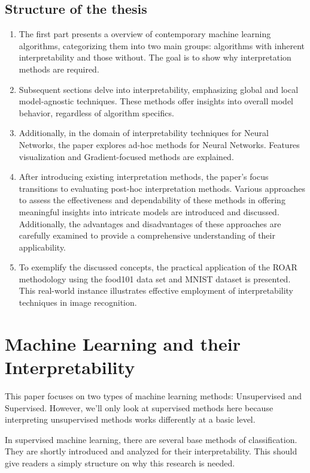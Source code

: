 \newpage
\section{Structure of the thesis}

\begin{enumerate}
	\item The first part presents a overview of contemporary machine learning algorithms, categorizing them into two main groups: algorithms with inherent interpretability and those without. The goal is to show why interpretation methods are required.
	\item Subsequent sections delve into interpretability, emphasizing global and local model-agnostic techniques. These methods offer insights into overall model behavior, regardless of algorithm specifics.   
	\item Additionally, in the domain of interpretability techniques for Neural Networks, the paper explores ad-hoc methods for Neural Networks. Features visualization and Gradient-focused methods are explained.
	\item After introducing existing interpretation methods, the paper's focus transitions to evaluating post-hoc interpretation methods. Various approaches to assess the effectiveness and dependability of these methods in offering meaningful insights into intricate models are introduced and discussed. Additionally, the advantages and disadvantages of these approaches are carefully examined to provide a comprehensive understanding of their applicability.
	\item To exemplify the discussed concepts, the practical application of the ROAR methodology using the food101 data set \cite{bossard14} and MNIST dataset \cite{deng2012mnist} is presented. This real-world instance illustrates effective employment of interpretability techniques in image recognition.
\end{enumerate}



\chapter{Machine Learning and their Interpretability}


This paper focuses on two types of machine learning methods: Unsupervised and Supervised. However, we'll only look at supervised methods here because interpreting unsupervised methods works differently at a basic level.

In supervised machine learning, there are several base methods of classification. They are shortly introduced and analyzed for their interpretability. This should give readers a simply structure on why this research is needed.

